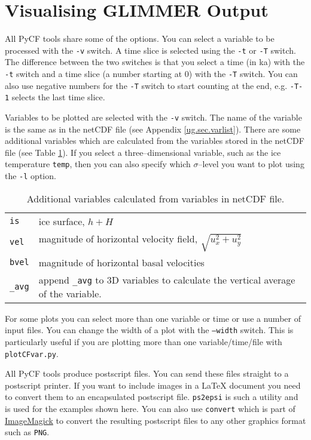 \section{Visualising GLIMMER Output}
All PyCF tools share some of the options. You can select a variable to be processed with the \texttt{-v} switch. A time slice is selected using the \texttt{-t} or \texttt{-T} switch. The difference between the two switches is that you select a time (in ka) with the \texttt{-t} switch and a time slice (a number starting at 0) with the \texttt{-T} switch. You can also use negative numbers for the \texttt{-T} switch to start counting at the end, e.g. \texttt{-T-1} selects the last time slice.

Variables to be plotted are selected with the \texttt{-v} switch. The name of the variable is the same as in the netCDF file (see Appendix \ref{ug.sec.varlist}). There are some additional variables which are calculated from the variables stored in the netCDF file (see Table \ref{tg.tab.extra_vars}). If you select a three--dimensional variable, such as the ice temperature \texttt{temp}, then you can also specify which $\sigma$--level you want to plot using the \texttt{-l} option.

\begin{table}[htbp]
  \centering
  \begin{tabular}{|p{}|p{}|}
    \hline
    \texttt{is} & ice surface, $h+H$ \\
    \texttt{vel} & magnitude of horizontal velocity field, $\sqrt{u_x^2+u_y^2}$ \\
    \texttt{bvel} & magnitude of horizontal basal velocities \\
    \texttt{\_avg} & append \texttt{\_avg} to 3D variables to calculate the vertical average of the variable.\\
    \hline
  \end{tabular}
  \caption{Additional variables calculated from variables in netCDF file.}
  \label{tg.tab.extra_vars}
\end{table}

For some plots you can select more than one variable or time or use a number of input files. You can change the width of a plot with the \texttt{--width} switch. This is particularly useful if you are plotting more than one variable/time/file with \texttt{plotCFvar.py}.

All PyCF tools produce postscript files. You can send these files straight to a postscript printer. If you want to include images in a {\LaTeX} document you need to convert them to an encapsulated postscript file. \texttt{ps2epsi} is such a utility and is used for the examples shown here. You can also use \texttt{convert} which is part of \href{http://www.imagemagick.org/script/index.php}{ImageMagick} to convert the resulting postscript files to any other graphics format such as \texttt{PNG}.

